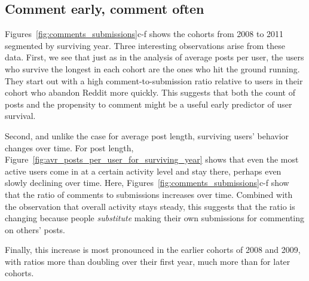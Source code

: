 \vfill\eject
\subsection{Comment early, comment often}

Figures~\ref{fig:comments_submissions}c-f shows the cohorts from 2008 to 2011 segmented by surviving year.  Three interesting observations arise from these data.  First, we see that just as in the analysis of average posts per user, the users who survive the longest in each cohort are the ones who hit the ground running.  They start out with a high comment-to-submission ratio relative to users in their cohort who abandon Reddit more quickly.  This suggests that both the count of posts and the propensity to comment might be a useful early predictor of user survival.

Second, and unlike the case for average post length, surviving users' behavior changes over time.  For post length, Figure~\ref{fig:avr_posts_per_user_for_surviving_year} shows that even the most active users come in at a certain activity level and stay there, perhaps even slowly declining over time.  Here, Figures~\ref{fig:comments_submissions}c-f show that the ratio of comments to submissions increases over time.  Combined with the observation that overall activity stays steady, this suggests that the ratio is changing because people \textit{substitute} making their own submissions for commenting on others' posts.

Finally, this increase is most pronounced in the earlier cohorts of 2008 and 2009, with ratios more than doubling over their first year, much more than for later cohorts.


